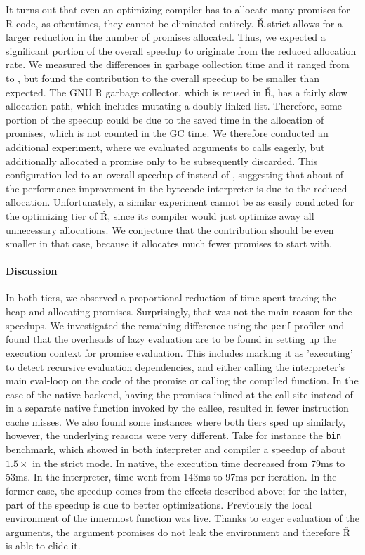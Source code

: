 \documentclass[review,creen,acmsmall]{acmart}
\renewcommand{\Rsh}{{\sf\v R}\xspace}
\newcommand{\Rshstrict}{{\sf\v R-strict}\xspace}
\begin{document}
It turns out that even an optimizing compiler has to allocate many promises for R
code, as oftentimes, they cannot be eliminated entirely. \Rshstrict allows for
a larger reduction in the number of promises allocated.
Thus, we expected a significant portion of the overall speedup to originate from
the reduced allocation rate. We measured the differences in garbage collection
time and it ranged from \speedupGCRshStrictMin to \speedupGCRshStrictMax, but
found the contribution to the overall speedup to be smaller than expected.
The GNU R garbage collector, which is reused in \Rsh, has a fairly slow allocation path, which
includes mutating a doubly-linked list. Therefore, some portion of the speedup
could be due to the saved time in the allocation of promises, which is not counted in the GC time.
We therefore conducted an additional experiment, where we evaluated arguments to
calls eagerly, but additionally allocated a promise only to be subsequently discarded.
This configuration led to an overall speedup of
\speedupBCRshStrictAlloc instead of \speedupBCRshStrict, suggesting that
about \speedupDueToReducedGC of the performance improvement in the bytecode interpreter is due to the
reduced allocation. Unfortunately, a similar experiment cannot be as easily conducted
for the optimizing tier of \Rsh, since its compiler would just optimize away all
unnecessary allocations. We conjecture that the contribution should be even
smaller in that case, because it allocates much fewer promises to start with.

\paragraph{Discussion}

In both tiers, we observed a proportional reduction of time spent tracing the
heap and allocating promises. Surprisingly, that was not the main reason
for the speedups. We investigated the remaining difference using the
\lstinline{perf} profiler and found that the overheads of lazy evaluation are to
be found in setting up the execution context for promise evaluation. This
includes marking it as 'executing' to detect recursive evaluation dependencies,
and either calling the interpreter's main eval-loop on the code of the promise or
calling the compiled function. In the case of the native backend, having the
promises inlined at the call-site instead of in a separate native function
invoked by the callee, resulted in fewer instruction cache misses. We also found
some instances where both tiers sped up similarly, however, the underlying
reasons were very different. Take for instance the \lstinline{bin} benchmark,
which showed in both interpreter and compiler a speedup of about $1.5\times$ in
the strict mode. In native, the execution time decreased from 79ms to 53ms. In
the interpreter, time went from 143ms to 97ms per iteration. In the former case,
the speedup comes from the effects described above; for the latter, part of the
speedup is due to better optimizations. Previously the local environment of
the innermost function was live. Thanks to eager evaluation of the arguments,
the argument promises do not leak the environment and therefore \Rsh is able to
elide it.
\end{document}
